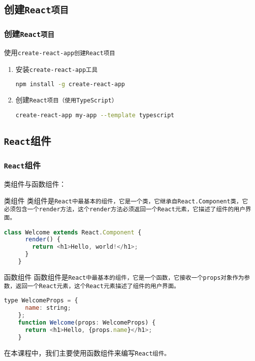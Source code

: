 \documentclass{beamer}
\begin{document}
\subsection{创建\tt{React}项目}
\begin{frame}
  \frametitle{创建\tt{React}项目}
  \begin{block}{使用\tt{create-react-app}创建\tt{React}项目}
    \begin{enumerate}
      \item 安装\tt{create-react-app}工具
            \begin{lstlisting}[language=bash]
    npm install -g create-react-app
\end{lstlisting}
      \item 创建\tt{React}项目（使用TypeScript）
            \begin{lstlisting}[language=bash]
    create-react-app my-app --template typescript
\end{lstlisting}
    \end{enumerate}
  \end{block}
\end{frame}

\subsection{\texttt{React}组件}
\begin{frame}
  \frametitle{\texttt{React}组件}

  类组件与函数组件：

  \begin{block}{类组件}
    类组件是\tt{React}中最基本的组件，它是一个类，它继承自\tt{React.Component}类，它必须包含一个\tt{render}方法，这个\tt{render}方法必须返回一个\tt{React}元素，它描述了组件的用户界面。
  \end{block}

  \begin{lstlisting}[language=JavaScript]
    class Welcome extends React.Component {
      render() {
        return <h1>Hello, world!</h1>;
      }
    }
\end{lstlisting}

  \framebreak

  \begin{block}{函数组件}
    函数组件是\tt{React}中最基本的组件，它是一个函数，它接收一个\tt{props}对象作为参数，返回一个\tt{React}元素，这个\tt{React}元素描述了组件的用户界面。
  \end{block}

  \begin{lstlisting}[language=JavaScript]
    type WelcomeProps = {
      name: string;
    };
    function Welcome(props: WelcomeProps) {
      return <h1>Hello, {props.name}</h1>;
    }
  \end{lstlisting}

  在本课程中，我们主要使用函数组件来编写\tt{React}组件。

\end{frame}
\end{document}
